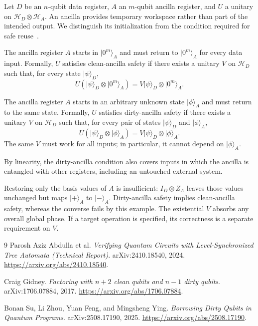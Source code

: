 \documentclass[runningheads]{llncs}
\begin{document}
Let $D$ be an $n$-qubit data register, $A$ an $m$-qubit ancilla register,
and $U$ a unitary on $\mathcal H_D\otimes\mathcal H_A$.
An ancilla provides temporary workspace rather than part of the intended
output. We distinguish its initialization from the condition required for
safe reuse~\cite{gidney,dirty}.

\begin{definition}
The ancilla register $A$ starts in $\lvert0^m\rangle_A$ and must return
to $\lvert0^m\rangle_A$ for every data input.
Formally, $U$ satisfies clean-ancilla safety if there exists a unitary $V$
on $\mathcal H_D$ such that, for every state $\lvert\psi\rangle_D$,
\begin{equation}\label{eq:clean-safety}
 U(\lvert\psi\rangle_D\otimes\lvert0^m\rangle_A)
 =V\lvert\psi\rangle_D\otimes\lvert0^m\rangle_A.
\end{equation}
\end{definition}

\begin{definition}
The ancilla register $A$ starts in an arbitrary unknown state
$\lvert\phi\rangle_A$ and must return to the same state.
Formally, $U$ satisfies dirty-ancilla safety if there exists a unitary $V$
on $\mathcal H_D$ such that, for every pair of states
$\lvert\psi\rangle_D$ and $\lvert\phi\rangle_A$,
\begin{equation}\label{eq:dirty-safety}
 U(\lvert\psi\rangle_D\otimes\lvert\phi\rangle_A)
 =V\lvert\psi\rangle_D\otimes\lvert\phi\rangle_A.
\end{equation}
The same $V$ must work for all inputs; in particular, it cannot depend on
$\lvert\phi\rangle_A$.
\end{definition}

By linearity, the dirty-ancilla condition also covers inputs in which
the ancilla is entangled with other registers, including an untouched
external system.

Restoring only the basis values of $A$ is insufficient:
$I_D\otimes Z_A$ leaves those values unchanged but maps
$\lvert+\rangle_A$ to $\lvert-\rangle_A$.
Dirty-ancilla safety implies clean-ancilla safety, whereas the converse
fails by this example. The existential $V$ absorbs any overall global phase.
If a target operation is specified, its correctness is a separate
requirement on $V$.

\begin{thebibliography}{9}
Parosh Aziz Abdulla et al.
\emph{Verifying Quantum Circuits with Level-Synchronized Tree Automata
(Technical Report)}.
arXiv:2410.18540, 2024.
\url{https://arxiv.org/abs/2410.18540}.

Craig Gidney.
\emph{Factoring with $n+2$ clean qubits and $n-1$ dirty qubits}.
arXiv:1706.07884, 2017.
\url{https://arxiv.org/abs/1706.07884}.

Bonan Su, Li Zhou, Yuan Feng, and Mingsheng Ying.
\emph{Borrowing Dirty Qubits in Quantum Programs}.
arXiv:2508.17190, 2025.
\url{https://arxiv.org/abs/2508.17190}.
\end{thebibliography}
\end{document}
